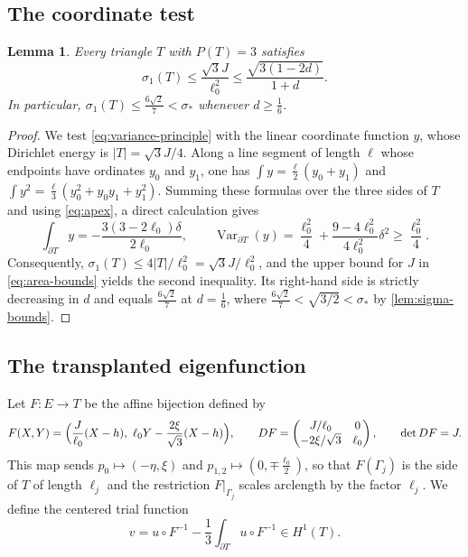 \documentclass[11pt,reqno]{amsart}
\numberwithin{equation}{section}
\newtheorem{lemma}[lemma]{Lemma}
\theoremstyle{remark}
\DeclareMathOperator{\Var}{Var}
\begin{document}
\subsection{The coordinate test}
\begin{lemma}\label{lem:coordinate}
Every triangle $T$ with $P(T)=3$ satisfies
\[
 \sigma_1(T)\le\frac{\sqrt3J}{\ell_0^2}\le\frac{\sqrt{3(1-2d)}}{1+d}.
\]
In particular, $\sigma_1(T)\le\frac{6\sqrt2}7<\sigma_*$ whenever $d\ge\frac16$.
\end{lemma}
\begin{proof}
We test \eqref{eq:variance-principle} with the linear coordinate function $y$,
whose Dirichlet energy is $|T|=\sqrt3J/4$. Along a line segment of length $\ell$
whose endpoints have ordinates $y_0$ and $y_1$, one has $\int y=\frac\ell2(y_0+y_1)$
and $\int y^2=\frac\ell3(y_0^2+y_0y_1+y_1^2)$. Summing these formulas over the
three sides of $T$ and using \eqref{eq:apex}, a direct calculation gives
\[
 \int_{\partial T}y=-\frac{3(3-2\ell_0)\delta}{2\ell_0},\qquad
 \Var_{\partial T}(y)=\frac{\ell_0^2}4+\frac{9-4\ell_0^2}{4\ell_0^2}\delta^2
 \ge\frac{\ell_0^2}4 .
\]
Consequently, $\sigma_1(T)\le4|T|/\ell_0^2=\sqrt3J/\ell_0^2$, and the upper bound
for $J$ in \eqref{eq:area-bounds} yields the second inequality. Its right-hand side
is strictly decreasing in $d$ and equals $\frac{6\sqrt2}7$ at $d=\frac16$, where
$\frac{6\sqrt2}7<\sqrt{3/2}<\sigma_*$ by \cref{lem:sigma-bounds}.
\end{proof}

\subsection{The transplanted eigenfunction}
Let $F:E\to T$ be the affine bijection defined by
\begin{equation}\label{eq:affine-map}
 F(X,Y)=\Bigl(\frac J{\ell_0}(X-h),\ \ell_0Y-\frac{2\xi}{\sqrt3}(X-h)\Bigr),
 \qquad
 DF=\begin{pmatrix}J/\ell_0&0\\-2\xi/\sqrt3&\ell_0\end{pmatrix},
 \qquad\det DF=J.
\end{equation}
This map sends $p_0\mapsto(-\eta,\xi)$ and $p_{1,2}\mapsto(0,\mp\frac{\ell_0}2)$,
so that $F(\Gamma_j)$ is the side of $T$ of length $\ell_j$ and the restriction
$F|_{\Gamma_j}$ scales arclength by the factor $\ell_j$. We define the centered
trial function
\begin{equation}\label{eq:trial}
 v=u\circ F^{-1}-\frac13\int_{\partial T}u\circ F^{-1}\in H^1(T).
\end{equation}
\end{document}
